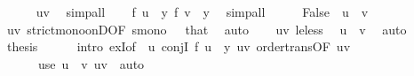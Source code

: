 \begin{isabellebody}
\ \ \ \ \isamarkupfalse%
\ uv\ \isamarkupfalse%
\ simp{\isacharunderscore}{\kern0pt}all\isanewline
\ \ \isamarkupfalse%
\ {\isachardoublequoteopen}f\ u\ {\isacharequal}{\kern0pt}\ y{\isachardoublequoteclose}\ {\isachardoublequoteopen}f\ v\ {\isacharequal}{\kern0pt}\ y{\isachardoublequoteclose}\ \isamarkupfalse%
\ simp{\isacharunderscore}{\kern0pt}all\isanewline
\ \ \isamarkupfalse%
\ \isamarkupfalse%
\ False\ \ {\isachardoublequoteopen}u\ {\isacharless}{\kern0pt}\ v{\isachardoublequoteclose}\isanewline
\ \ \ \ \isamarkupfalse%
\ uv{\isacharparenleft}{\kern0pt}{}{\isacharminus}{\kern0pt}{}{\isacharparenright}{\kern0pt}\ strict{\isacharunderscore}{\kern0pt}mono{\isacharunderscore}{\kern0pt}onD{\isacharbrackleft}{\kern0pt}OF\ smono\ {\isacharunderscore}{\kern0pt}\ {\isacharunderscore}{\kern0pt}\ that{\isacharbrackright}{\kern0pt}\ \isamarkupfalse%
\ auto\isanewline
\ \ \isamarkupfalse%
\ uv{\isacharparenleft}{\kern0pt}{}{\isacharparenright}{\kern0pt}\ le{\isacharunderscore}{\kern0pt}less\ \isamarkupfalse%
\ {\isachardoublequoteopen}u\ {\isacharequal}{\kern0pt}\ v{\isachardoublequoteclose}\ \isamarkupfalse%
\ auto\isanewline
\ \ \isamarkupfalse%
\ {\isacharquery}{\kern0pt}thesis\isanewline
\ \ \ \ \isamarkupfalse%
\ {\isacharparenleft}{\kern0pt}intro\ ex{}I{\isacharbrackleft}{\kern0pt}of\ {\isacharunderscore}{\kern0pt}\ u{\isacharbrackright}{\kern0pt}\ conjI\ {\isacartoucheopen}f\ u\ {\isacharequal}{\kern0pt}\ y{\isacartoucheclose}\ uv{\isacharparenleft}{\kern0pt}{}{\isacharparenright}{\kern0pt}\ order{\isachardot}{\kern0pt}trans{\isacharbrackleft}{\kern0pt}OF\ uv{\isacharparenleft}{\kern0pt}{}{\isacharcomma}{\kern0pt}{}{\isacharparenright}{\kern0pt}{\isacharbrackright}{\kern0pt}{\isacharparenright}{\kern0pt}\isanewline
\ \ \ \ \ \ {\isacharparenleft}{\kern0pt}use\ {\isacartoucheopen}u\ {\isacharequal}{\kern0pt}\ v{\isacartoucheclose}\ uv{\isacharparenleft}{\kern0pt}{}{\isacharparenright}{\kern0pt}\ \ auto{\isacharparenright}{\kern0pt}\isanewline
{}\isamarkupfalse%
%
\endisatagproof
{\isafoldproof}%
%
\isadelimproof
%
\endisadelimproof
%
\isadelimdocument
%
\endisadelimdocument
%
\isatagdocument
%
\end{isabellebody}
